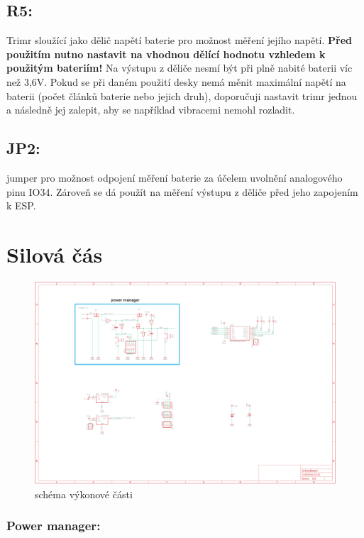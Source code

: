 \documentclass{template/socthesis}
\begin{document}
\begin{itemize}
	\subsection*{R5:}
	Trimr sloužící jako dělič napětí baterie pro možnost měření jejího napětí. 
	\textbf{Před použitím nutno nastavit na vhodnou dělící hodnotu vzhledem k použitým bateriím!} Na výstupu z děliče nesmí být při plně nabité baterii víc než 3,6V. Pokud se při daném použití desky nemá měnit maximální napětí na baterii (počet článků baterie nebo jejich druh), doporučuji nastavit trimr jednou a následně jej zalepit, aby se například vibracemi nemohl rozladit.
	
	\subsection*{JP2:}
	jumper pro možnost odpojení měření baterie za účelem uvolnění analogového pinu IO34. Zároveň se dá použít na měření výstupu z děliče před jeho zapojením k ESP.
	
	\section*{Silová čás}
	
	\begin{figure}[h]
		\centering
		\includegraphics[width=\textwidth]{img/silovka.png}
		\caption{schéma výkonové části}
	\end{figure}

	\subsubsection*{Power manager:}
	

\end{itemize}
\end{document}
